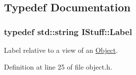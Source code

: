 \subsection{Typedef Documentation}
\hypertarget{namespace_i_stuff_a88882361612ef78eee4224382c8d126b}{
\subsubsection[{Label}]{\setlength{\rightskip}{0pt plus 5cm}typedef std\-::string {\bf I\-Stuff\-::\-Label}}}\label{namespace_i_stuff_a88882361612ef78eee4224382c8d126b}


Label relative to a view of an \hyperlink{class_i_stuff_1_1_object}{Object}. 



Definition at line 25 of file object.\-h.


